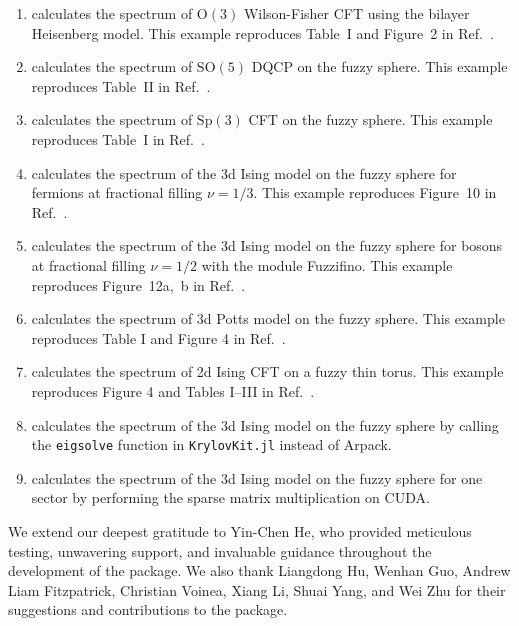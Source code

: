 \documentclass{timesjhep}
\begin{document}
\begin{enumerate}
    \item {} calculates the spectrum of $\mathrm{O}(3)$ Wilson-Fisher CFT using the bilayer Heisenberg model. This example reproduces Table~I and Figure~2 in Ref.~\cite{Han2023Dec}.
    \item {} calculates the spectrum of $\mathrm{SO}(5)$ DQCP on the fuzzy sphere. This example reproduces Table~II in Ref.~\cite{Zhou2023}.
    \item {} calculates the spectrum of $\mathrm{Sp}(3)$ CFT on the fuzzy sphere. This example reproduces Table~I in Ref.~\cite{Zhou2024Oct}.
    \item {} calculates the spectrum of the 3d Ising model on the fuzzy sphere for fermions at fractional filling $\nu = 1/3$. This example reproduces Figure~10 in Ref.~\cite{Voinea2024}.
    \item {} calculates the spectrum of the 3d Ising model on the fuzzy sphere for bosons at fractional filling $\nu = 1/2$ with the module Fuzzifino. This example reproduces Figure~12a,~b in Ref.~\cite{Voinea2024}.
    \item {} calculates the spectrum of 3d Potts model on the fuzzy sphere. This example reproduces Table I and Figure 4 in Ref.~\cite{Yang2025}.
    \item {} calculates the spectrum of 2d Ising CFT on a fuzzy thin torus. This example reproduces Figure 4 and Tables I--III in Ref.~\cite{Han2025}.
    \item {} calculates the spectrum of the 3d Ising model on the fuzzy sphere by calling the \lstinline|eigsolve| function in \lstinline|KrylovKit.jl| instead of Arpack.
    \item {} calculates the spectrum of the 3d Ising model on the fuzzy sphere for one sector by performing the sparse matrix multiplication on CUDA.
\end{enumerate}

\clearpage
\acknowledgments

We extend our deepest gratitude to Yin-Chen He, who provided meticulous testing, unwavering support, and invaluable guidance throughout the development of the package. We also thank Liangdong Hu, Wenhan Guo, Andrew Liam Fitzpatrick, Christian Voinea, Xiang Li, Shuai Yang, and Wei Zhu for their suggestions and contributions to the package.
\end{document}
